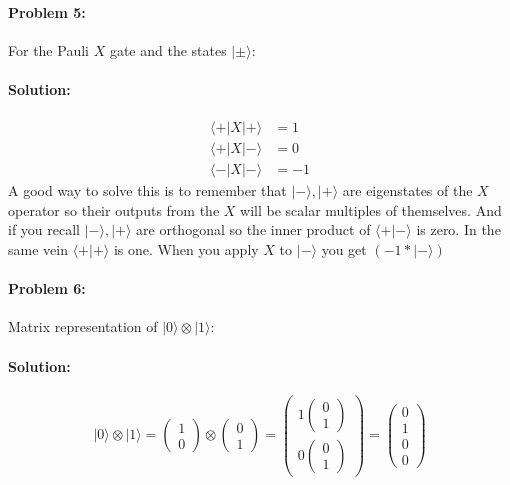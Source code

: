 \documentclass{article}
\begin{document}
\paragraph{Problem 5:} For the Pauli \( X \) gate and the states \( |\pm\rangle \):

\paragraph{Solution:}
\begin{align*}
\langle + | X | + \rangle &= 1 \\
\langle + | X | - \rangle &= 0 \\
\langle - | X | - \rangle &= -1
\end{align*}
A good way to solve this is to remember that \( | - \rangle,| + \rangle \) are eigenstates of the \( X \) operator so their outputs from the \( X \) will be scalar multiples of themselves. And if you recall \( | - \rangle,| + \rangle \) are orthogonal so the inner product of \( \langle + | - \rangle \) is zero. In the same vein \( \langle + | + \rangle \) is one. When you apply \( X \) to \( | - \rangle \) you get \( (-1*| - \rangle) \)

\paragraph{Problem 6:} Matrix representation of \( |0\rangle \otimes |1\rangle \):

\paragraph{Solution:}
\[
|0\rangle \otimes |1\rangle = \begin{pmatrix} 1 \\ 0 \end{pmatrix} \otimes \begin{pmatrix} 0 \\ 1 \end{pmatrix} = \begin{pmatrix} 1 \begin{pmatrix} 0 \\ 1 \end{pmatrix} \\ 0 \begin{pmatrix} 0 \\ 1 \end{pmatrix} \end{pmatrix} = \begin{pmatrix} 0 \\ 1 \\ 0 \\ 0 \end{pmatrix}
\]
\end{document}
